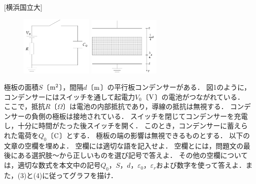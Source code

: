 


\noindent{} [横浜国立大]

\begin{figure}
  \centering
  \begin{minipage}{3.5cm}
    \centering
    \includegraphics[width=3.5cm]{fig/fig_4_20_1.pdf}
    \caption{}
  \end{minipage}
  \hspace{1em}
  \begin{minipage}{3.8cm}
    \centering
    \includegraphics[width=3.5cm]{fig/fig_4_20_2.pdf}
    \caption{}
  \end{minipage}
\end{figure}
極板の面積$S$〔$\mathrm{m}^2$〕，間隔$d$〔$\mathrm{m}$〕の平行板コンデンサーがある．
図1のように，コンデンサーにはスイッチを通して起電力$V_0$〔$\mathrm{V}$〕の電池がつながれている．
ここで，抵抗$R$〔$\Omega$〕は電池の内部抵抗であり，導線の抵抗は無視する．
コンデンサーの負側の極板は接地されている．
スイッチを閉じてコンデンサーを充電し，十分に時間がたった後スイッチを開く．
このとき，コンデンサーに蓄えられた電荷を$Q_0$〔$\mathrm{C}$〕とする．
極板の端の影響は無視できるものとする．
以下の文章の空欄を埋めよ．
空欄には適切な語を記入せよ．
空欄とには，問題文の最後にある選択肢〜から正しいものを選び記号で答えよ．
その他の空欄については，適切な数式を本文中の記号$Q_0$，$S$，$d$，$\varepsilon_0$，$\varepsilon_r$および数字を使って答えよ．また，(3)と(4)に従ってグラフを描け．

